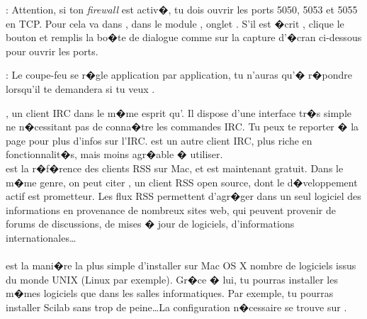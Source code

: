 \noindent  {} : Attention, si ton \emph{firewall} est activ�, tu dois ouvrir les ports 5050, 5053 et 5055 en TCP. Pour cela va dans , dans le module , onglet . S'il est �crit , clique le bouton  et remplis
la bo�te de dialogue comme sur la capture d'�cran ci-dessous pour ouvrir les ports.


\noindent {} : Le coupe-feu se r�gle application par application, tu n'auras qu'� r�pondre  lorsqu'il te demandera si tu veux .



\noindent{}, un client IRC dans le m�me esprit qu'. Il dispose d'une interface tr�s simple ne n�cessitant pas de conna�tre les commandes IRC. Tu peux te reporter � la page \pageref{irc} pour plus d'infos sur l'IRC.  est un autre client IRC, plus riche en fonctionnalit�s, mais moins agr�able � utiliser. \\

\noindent{} est la r�f�rence des clients RSS sur Mac, et est maintenant gratuit. Dans le m�me genre, on peut citer , un client RSS open source, dont le d�veloppement actif est prometteur. Les flux RSS permettent d'agr�ger dans un seul logiciel des informations en provenance de nombreux sites web, qui peuvent provenir de forums de discussions, de mises � jour de logiciels, d'informations internationales\dots \\ \\

\noindent{} est la mani�re la plus simple d'installer sur Mac OS X nombre de logiciels issus du monde UNIX (Linux par exemple). Gr�ce � lui, tu pourras installer les m�mes logiciels que dans les salles informatiques. Par exemple, tu pourras installer Scilab sans trop de peine\dots La configuration n�cessaire se trouve sur . \\ \\

